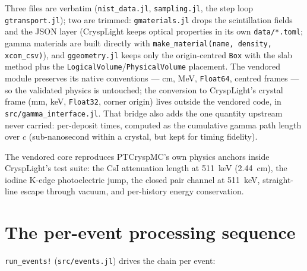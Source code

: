 \documentclass[11pt,a4paper]{article}
\newcommand{\code}[1]{\texttt{#1}}
\begin{document}
Three files are verbatim (\code{nist\_data.jl}, \code{sampling.jl}, the step loop
\code{gtransport.jl}); two are trimmed: \code{gmaterials.jl} drops the scintillation
fields and the JSON layer (CryspLight keeps optical properties in its own
\code{data/*.toml}; gamma materials are built directly with
\code{make\_material(name, density, xcom\_csv)}), and \code{ggeometry.jl} keeps only
the origin-centred \code{Box} with the slab method plus the
\code{LogicalVolume}/\code{PhysicalVolume} placement. The vendored module preserves
its native conventions --- cm, MeV, \code{Float64}, centred frames --- so the
validated physics is untouched; the conversion to CryspLight's crystal frame
(mm, keV, \code{Float32}, corner origin) lives outside the vendored code, in
\code{src/gamma\_interface.jl}. That bridge also adds the one quantity upstream never
carried: per-deposit times, computed as the cumulative gamma path length over $c$
(sub-nanosecond within a crystal, but kept for timing fidelity).

The vendored core reproduces PTCryspMC's own physics anchors inside CryspLight's test
suite: the CsI attenuation length at 511~keV (2.44~cm), the iodine K-edge
photoelectric jump, the closed pair channel at 511~keV, straight-line escape through
vacuum, and per-history energy conservation.

\section{The per-event processing sequence}

\code{run\_events!} (\code{src/events.jl}) drives the chain per event:
\end{document}
